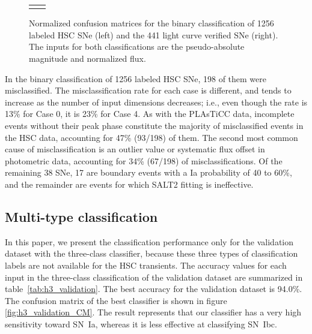 \documentclass[useamsfonts]{pasj01}
\begin{document}
\begin{figure}[htbp]
\begin{tabular}{cc}
\begin{minipage}{0.5\hsize}
\begin{center}
            \end{center}
        \end{minipage}
    \end{tabular}
    \caption{%
  Normalized confusion matrices for the binary classification of 1256 labeled HSC SNe (left) and the 441 light curve verified SNe (right).
  The inputs for both classifications are the pseudo-absolute magnitude and normalized flux.
}%
    \label{fig:h2_test_CM}
\end{figure}
%

In the binary classification of 1256 labeled HSC SNe, 198 of them were misclassified.
The misclassification rate for each case is different, and tends to increase as the number of input dimensions decreases;
i.e., even though the rate is 13\% for Case 0, it is 23\% for Case 4.
As with the PLAsTiCC data, incomplete events without their peak phase constitute the majority of misclassified events in the HSC data, accounting for 47\% (93/198) of them.
The second most common cause of misclassification is an outlier value or systematic flux offset in photometric data, accounting for 34\% (67/198) of misclassifications.
Of the remaining 38 SNe, 17 are boundary events with a Ia probability of 40 to 60\%, and the remainder are events for which SALT2 fitting is ineffective.

%
%
\subsection{Multi-type classification}
\label{sec:h3}
%
In this paper, we present the classification performance only for the validation dataset with the three-class classifier, because these three types of classification labels are not available for the HSC transients.
%
The accuracy values for each input in the three-class classification of the validation dataset are summarized in table\ \ref{tab:h3_validation}.
The best accuracy for the validation dataset is 94.0\%.
The confusion matrix of the best classifier is shown in figure \ref{fig:h3_validation_CM}.
The result represents that our classifier has a very high sensitivity toward SN~Ia, whereas it is less effective at classifying SN~Ibc.
\end{document}

